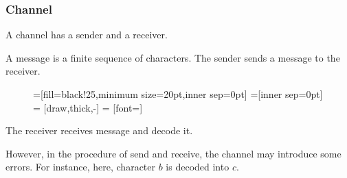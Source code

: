 \documentclass{beamer}
\begin{document}
                  \begin{frame}
                        \frametitle{Channel}
                        \begin{definition}[channel]
                              A channel has a sender and a receiver.
                              \pause


                              A message is a finite sequence of characters.
                              The sender sends a message to the receiver.
                              \begin{figure}[h!]
                                    =[fill=black!25,minimum size=20pt,inner sep=0pt]
                                    =[inner sep=0pt]
                                     = [draw,thick,-]
                                     = [font=\small]
                              \end{figure}
                              \pause
                              
                              The receiver receives message and decode it.
                              \pause

                              However, in the procedure of send and receive, the channel may introduce some errors. For instance, here, character $b$ is decoded into $c$. 
                        \end{definition}
                  \end{frame}
\end{document}
